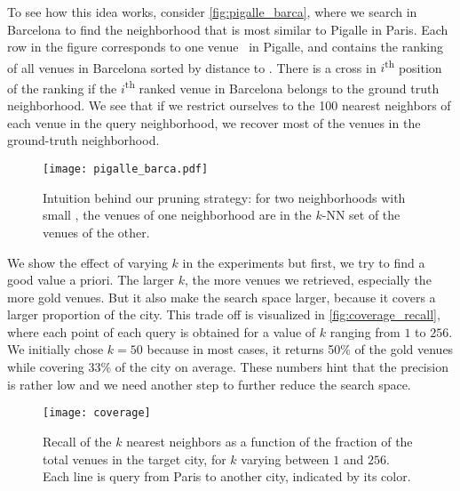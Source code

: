To see how this idea works, consider \autoref{fig:pigalle_barca}, 
where we search in Barcelona to find the neighborhood that is most
similar to Pigalle in Paris. 
Each row in the figure corresponds to one venue \venue\ in Pigalle, 
and contains the ranking of all venues in Barcelona sorted by distance to
\venue. 
There is a cross
 in $i$\textsuperscript{th} position of the ranking if the
$i$\textsuperscript{th} ranked venue in Barcelona belongs to the ground truth
neighborhood.
We see that if we restrict ourselves to the 100 nearest neighbors of
each venue in the query neighborhood, 
we recover most of the venues in the ground-truth neighborhood.

\begin{figure}[b]
    \centering
    \texttt{[image: pigalle\_barca.pdf]}
    \caption[Ranking of target city venues by distance to query
    venus.]{Intuition behind our pruning strategy: 
for two neighborhoods with small \emd, 
the venues of one neighborhood are in the $k$-NN set of the venues of
the other.  \label{fig:pigalle_barca}}
\end{figure}

We show the effect of varying $k$ in the experiments but first, we try to find
a good value a priori.  The larger $k$, the more venues we retrieved,
especially the more gold venues. But it also make the search space larger,
because it covers a larger proportion of the city. This trade off is visualized
in \autoref{fig:coverage_recall}, where each point of each query is obtained
for a value of $k$ ranging from $1$ to $256$. We initially chose $k=50$
because in most cases, it returns 50\% of the gold venues while covering 33\%
of the city on average. These numbers hint that the precision is rather low and
we need another step to further reduce the search space.

\medskip

\begin{figure}[tb]
    \centering
    \texttt{[image: coverage]}
    \caption[Recall vs coverage of $k$ nearest neighbors]{Recall of the $k$
	    nearest neighbors as a function of the fraction of the total
	    venues in the target city, for $k$ varying between $1$ and $256$.
	    Each line is query from Paris to another city, indicated by its
	    color.\label{fig:coverage_recall}}
\end{figure}


